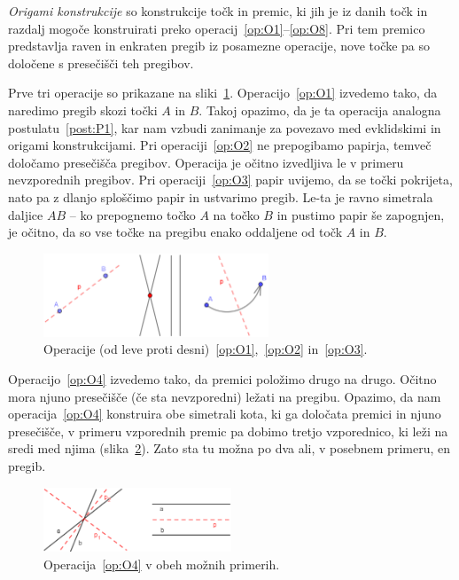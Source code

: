 \begin{definicija}
    \label{def:origami_konstruktibilnost}
    \emph{Origami konstrukcije} so konstrukcije točk in premic, ki jih je iz danih točk in razdalj mogoče konstruirati preko operacij~\ref{op:O1}--\ref{op:O8}. Pri tem premico predstavlja raven in enkraten pregib iz posamezne operacije, nove točke pa so določene s presečišči teh pregibov.
\end{definicija}

Prve tri operacije so prikazane na sliki~\ref{fig:O1-O3}. Operacijo~\ref{op:O1} izvedemo tako, da naredimo pregib skozi točki $A$ in $B$. Takoj opazimo, da je ta operacija analogna postulatu~\ref{post:P1}, kar nam vzbudi zanimanje za povezavo med evklidskimi in origami konstrukcijami. Pri operaciji~\ref{op:O2} ne prepogibamo papirja, temveč določamo presečišča pregibov. Operacija je očitno izvedljiva le v primeru nevzporednih pregibov. Pri operaciji~\ref{op:O3} papir uvijemo, da se točki pokrijeta, nato pa z dlanjo sploščimo papir in ustvarimo pregib. Le-ta je ravno simetrala daljice $AB$ -- ko prepognemo točko $A$ na točko $B$ in pustimo papir še zapognjen, je očitno, da so vse točke na pregibu enako oddaljene od točk $A$ in $B$.

\begin{figure}[h]
    \centering
    \includegraphics[width=0.6\textwidth]{images/origami_operacije/O1doO3.png}
    \caption[Operacije~\ref{op:O1},~\ref{op:O2} in~\ref{op:O3}]{Operacije (od leve proti desni)~\ref{op:O1},~\ref{op:O2} in~\ref{op:O3}.}
    \label{fig:O1-O3}
\end{figure}

Operacijo~\ref{op:O4} izvedemo tako, da premici položimo drugo na drugo. Očitno mora njuno presečišče (če sta nevzporedni) ležati na pregibu. Opazimo, da nam operacija~\ref{op:O4} konstruira obe simetrali kota, ki ga določata premici in njuno presečišče, v primeru vzporednih premic pa dobimo tretjo vzporednico, ki leži na sredi med njima (slika~\ref{fig:O4}). Zato sta tu možna po dva ali, v posebnem primeru, en pregib.

\begin{figure}[h]
    \centering
    \includegraphics[width=0.5\textwidth]{images/origami_operacije/O4.png}
    \caption[Operacija~\ref{op:O4}]{Operacija~\ref{op:O4} v obeh možnih primerih.}
    \label{fig:O4}
\end{figure}


